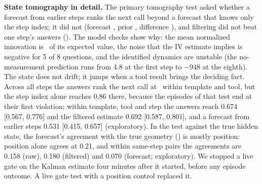 \textbf{State tomography in detail.} The primary tomography test asked whether a forecast from earlier steps ranks the next call beyond a forecast that knows only the step index; it did not (forecast \GTsForecast, prior \GTsPrior, difference \GTsKone), and filtering did not beat one step's answers (\GTsKtwo). The model checks show why: the mean normalized innovation is \GTsNis\ of its expected value, the noise that the IV estimate implies is negative for 5 of 8 questions, and the identified dynamics are unstable (the no-measurement prediction runs from 4.8 at the first step to $-948$ at the eighth). The state does not drift; it jumps when a tool result brings the deciding fact. Across all steps the answers rank the next call at \GTsRaw\ within template and tool, but the step index alone reaches 0.86 there, because the episodes of that test end at their first violation; within template, tool and step the answers reach 0.674 [0.567, 0.776] and the filtered estimate 0.692 [0.587, 0.801], and a forecast from earlier steps 0.531 [0.415, 0.657] (exploratory). In the test against the true hidden state, the forecast's agreement with the true geometry (\GTeForecast) is mostly position: position alone agrees at 0.21, and within same-step pairs the agreements are 0.158 (raw), 0.180 (filtered) and 0.070 (forecast; exploratory). We stopped a live gate on the Kalman estimate four minutes after it started, before any episode outcome. A live gate test with a position control replaced it.

